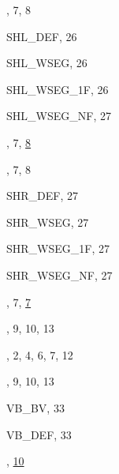 \begin{theindex}
  \item {}, 7, 8
  \item {\ptt SHL\_DEF}, 26
  \item {\ptt SHL\_WSEG}, 26
  \item {\ptt SHL\_WSEG\_1F}, 26
  \item {\ptt SHL\_WSEG\_NF}, 27
  \item {}, 7, \ul{8}
  \item {}, 7, 8
  \item {\ptt SHR\_DEF}, 27
  \item {\ptt SHR\_WSEG}, 27
  \item {\ptt SHR\_WSEG\_1F}, 27
  \item {\ptt SHR\_WSEG\_NF}, 27
  \item {}, 7, \ul{7}
  \item {}, 9, 10, 13

  \indexspace

  \item {}, 2, 4, 6, 7, 12

  \indexspace

  \item {}, 9, 10, 13
  \item {\ptt VB\_BV}, 33
  \item {\ptt VB\_DEF}, 33
  \item {}, \ul{10}

  \indexspace


\end{theindex}
